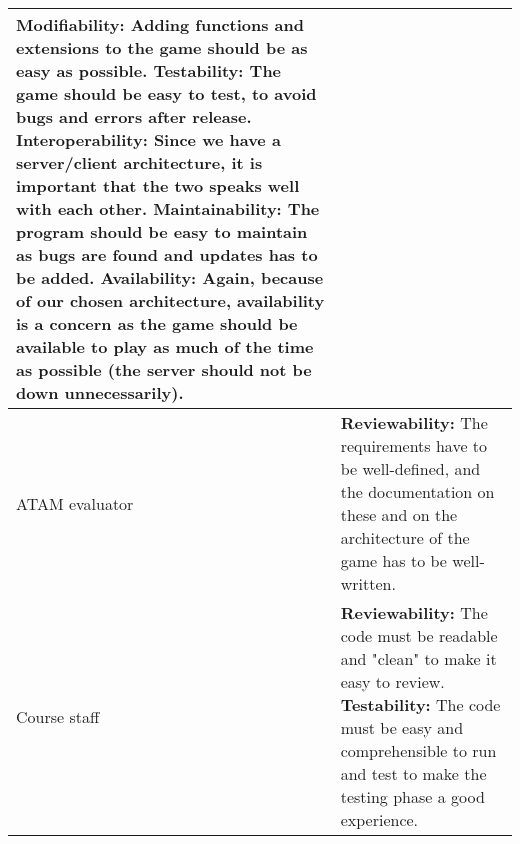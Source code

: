 \begin{center}
\begin{longtable}{|p{3cm} | p{10cm}|}
        \newline \textbf{Modifiability:} Adding functions and extensions to the game should be as easy as possible.
        \newline \textbf{Testability:} The game should be easy to test, to avoid bugs and errors after release. 
        \newline \textbf{Interoperability:} Since we have a server/client architecture, it is important that the two speaks well with each other. 
        \newline \textbf{Maintainability:} The program should be easy to maintain as bugs are found and updates has to be added.
        \newline \textbf{Availability:} Again, because of our chosen architecture, availability is a concern as the game should be available to play as much of the time as possible (the server should not be down unnecessarily). \\ \hline
        ATAM evaluator &
        \textbf{Reviewability:} The requirements have to be well-defined, and the documentation on these and on the architecture of the game has to be well-written.\\ \hline
        Course staff & 
        \textbf{Reviewability:} The code must be readable and "clean" to make it easy to review.
        \newline \textbf{Testability:} The code must be easy and comprehensible to run and test to make the testing phase a good experience.\\ \hline
\end{longtable}
\end{center}

